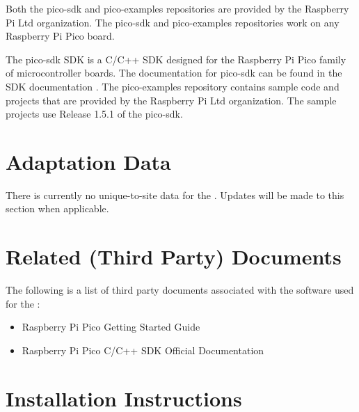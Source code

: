{Both the pico-sdk and pico-examples repositories are provided by the Raspberry Pi Ltd organization. 
The pico-sdk and pico-examples repositories work on any Raspberry Pi Pico board.

The pico-sdk SDK is a C/C++ SDK designed for the Raspberry Pi Pico family of microcontroller boards. The documentation for pico-sdk can be found in the SDK documentation \cite{ref__RP_Pico_C_SDK}.
The pico-examples repository contains sample code and projects that are provided by the Raspberry Pi Ltd organization. The sample projects use Release 1.5.1 of the pico-sdk. 

% 



\section{Adaptation Data}
\label{loc:AdaptationData}
% 

There is currently no unique-to-site data for the \ThisSystem. Updates will be made to this section when applicable.


\section{Related (Third Party) Documents}
\label{loc:RelatedDocuments}
% 

The following is a list of third party documents associated with the software used for the \ThisSystem:

\begin{itemize}
    \item \cite{ref__RP_Getting_Started} Raspberry Pi Pico Getting Started Guide
    \item \cite{ref__RP_Pico_C_SDK} Raspberry Pi Pico C/C++ SDK Official Documentation
\end{itemize}


\section{Installation Instructions}
\label{loc:InstallationInstructions}
% 

}
